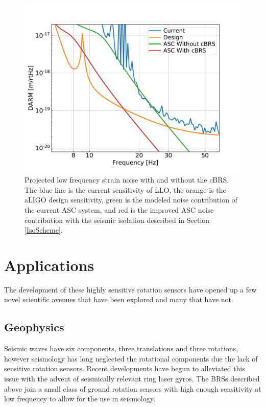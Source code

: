 \documentclass [12pt, proquest]{uwthesis}[2019]
\begin{document}
\begin{figure}
\begin{center}
\includegraphics[width=\textwidth]{cBRS_ASC.pdf}
\caption{Projected low frequency strain noise with and without the cBRS. The blue line is the current sensitivity of LLO, the orange is the aLIGO design sensitivity, green is the modeled noise contribution of the current ASC system, and red is the improved ASC noise contribution with the seismic isolation described in Section \ref{IsoScheme}. }
\label{ascStrain}
\end{center}
\end{figure}

\chapter{Applications}
\quad The development of these highly sensitive rotation sensors have opened up a few novel scientific avenues that have been explored and many that have not.

\section{Geophysics}
Seismic waves have six components, three translations and three rotations, however seismology has long neglected the rotational components due the lack of sensitive rotation sensors. Recent developments have begun to alleviated this issue with the advent of seismically relevant ring laser gyros. \cite{ring} The BRSs described above join a small class of ground rotation sensors with high enough sensitivity at low frequency to allow for the use in seismology.
\end{document}
